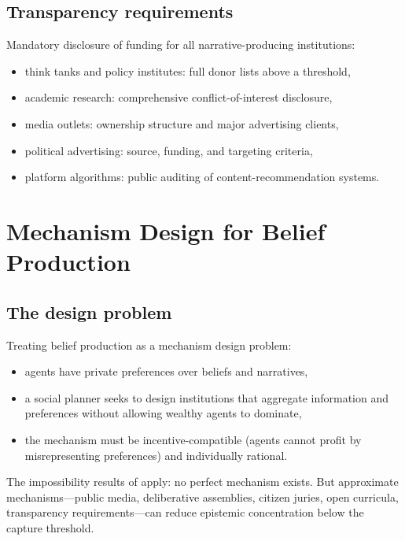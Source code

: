 \subsection{Transparency requirements}

Mandatory disclosure of funding for all narrative-producing institutions:
\begin{itemize}[nosep]
  \item think tanks and policy institutes: full donor lists above a threshold,
  \item academic research: comprehensive conflict-of-interest disclosure,
  \item media outlets: ownership structure and major advertising clients,
  \item political advertising: source, funding, and targeting criteria,
  \item platform algorithms: public auditing of content-recommendation systems.
\end{itemize}

\section{Mechanism Design for Belief Production}
\label{sec:ch32-mechanism}

\subsection{The design problem}

\begin{model}
\label{mod:democratic-belief}
Treating belief production as a mechanism design problem:
\begin{itemize}[nosep]
  \item agents have private preferences over beliefs and narratives,
  \item a social planner seeks to design institutions that aggregate information and preferences without allowing wealthy agents to dominate,
  \item the mechanism must be incentive-compatible (agents cannot profit by misrepresenting preferences) and individually rational.
\end{itemize}
The impossibility results of \textcite{arrow1963} apply: no perfect mechanism exists.
But approximate mechanisms---public media, deliberative assemblies, citizen juries, open curricula, transparency requirements---can reduce epistemic concentration below the capture threshold.
\end{model}

